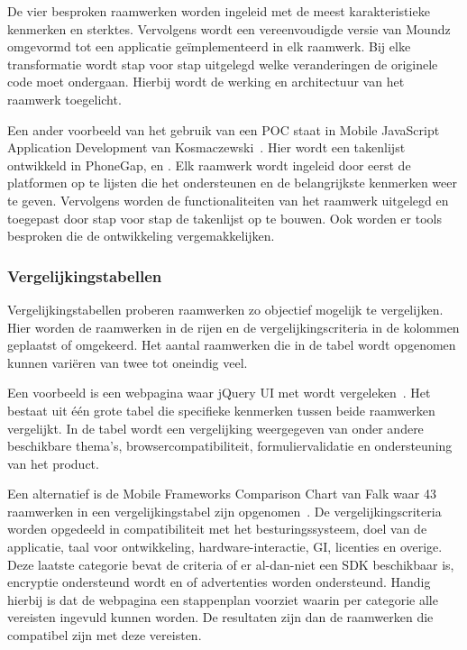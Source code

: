 De vier besproken raamwerken worden ingeleid met de meest karakteristieke kenmerken en sterktes.
Vervolgens wordt een vereenvoudigde versie van Moundz omgevormd tot een applicatie geïmplementeerd in elk raamwerk.
Bij elke transformatie wordt stap voor stap uitgelegd welke veranderingen de originele code moet ondergaan.
Hierbij wordt de werking en architectuur van het raamwerk toegelicht.

Een ander voorbeeld van het gebruik van een POC staat in Mobile JavaScript Application Development van Kosmaczewski~\cite{Kosmaczewski2012}.
Hier wordt een takenlijst ontwikkeld in PhoneGap, \st{} en \jqm{}.
Elk raamwerk wordt ingeleid door eerst de platformen op te lijsten die het ondersteunen en de belangrijkste kenmerken weer te geven.
Vervolgens worden de functionaliteiten van het raamwerk uitgelegd en toegepast door stap voor stap de takenlijst op te bouwen.
Ook worden er tools besproken die de ontwikkeling vergemakkelijken.

\subsubsection{Vergelijkingstabellen}
\label{sec:manier-vergelijkingstabellen}
Vergelijkingstabellen proberen raamwerken zo objectief mogelijk te vergelijken.
Hier worden de raamwerken in de rijen en de vergelijkingscriteria in de kolommen geplaatst of omgekeerd.
Het aantal raamwerken die in de tabel wordt opgenomen kunnen variëren van twee tot oneindig veel.

Een voorbeeld is een webpagina waar jQuery UI met \kendo{} wordt vergeleken~\cite{Bristowe2012}.
Het bestaat uit één grote tabel die specifieke kenmerken tussen beide raamwerken vergelijkt.
In de tabel wordt een vergelijking weergegeven van onder andere beschikbare thema's,  browsercompatibiliteit,  formuliervalidatie en  ondersteuning van het product.

Een alternatief is de Mobile Frameworks Comparison Chart van Falk waar 43 raamwerken in een vergelijkingstabel zijn opgenomen~\cite{Falk2011}. 
De vergelijkingscriteria worden opgedeeld in compatibiliteit met het besturingssysteem,  doel van de applicatie,  taal voor ontwikkeling,  hardware-interactie,  GI,  licenties en overige.  
Deze laatste categorie bevat de criteria of er al-dan-niet een SDK beschikbaar is, encryptie ondersteund wordt en of advertenties worden ondersteund.  
Handig hierbij is dat de webpagina een stappenplan voorziet waarin per categorie alle vereisten ingevuld kunnen worden.  
De resultaten zijn dan de raamwerken die compatibel zijn met deze vereisten.

